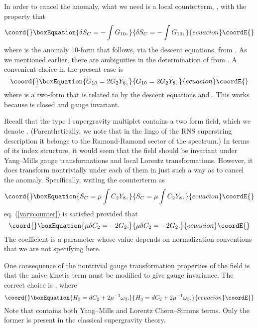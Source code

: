 \documentclass[a4paper,12pt]{article}
\begin{document}
In order to cancel the anomaly, what we need is a local
counterterm, \coordHE{}, with the property that
\begin{equation}\coord{}\boxEquation{ \label{varycounter}
\delta S_{C} = - \int G_{10},
}{ \delta S_{C} = - \int G_{10},
}{ecuacion}\coordE{}\end{equation}
where \coordHE{} is the anomaly  10-form that follows, via the
descent equations, from \coordHE{}. As we mentioned
earlier, there are ambiguities in the determination of \coordHE{}
from \coordHE{}. A convenient choice in the present case is 
\begin{equation}\coord{}\boxEquation{
G_{10} =  2 G_2 Y_8,
}{
G_{10} =  2 G_2 Y_8,
}{ecuacion}\coordE{}\end{equation} 
where \coordHE{} is a two-form that is related to \coordHE{} by
the descent equations \coordHE{} and \coordHE{}. 
This works because \coordHE{} is closed and
gauge invariant.

Recall that the type I supergravity multiplet contains a two form
field, which we denote \coordHE{}. (Parenthetically, we note that in
the lingo of the RNS superstring description it belongs to the
Ramond-Ramond sector of the spectrum.) In terms of its index
structure, it would seem that the field \coordHE{} should be invariant
under Yang--Mills gauge transformations and local Lorentz
transformations. However, it does transform nontrivially under
each of them in just such a way as to cancel the
anomaly.\cite{Green:1984sg} Specifically, writing the counterterm
as
\begin{equation}\coord{}\boxEquation{
 S_{C} = \mu \int C_2 Y_8,
}{
 S_{C} = \mu \int C_2 Y_8,
}{ecuacion}\coordE{}\end{equation}
eq. (\ref{varycounter}) is satisfied provided that
\begin{equation}\coord{}\boxEquation{
\mu \delta C_2 = -2 G_2.
}{
\mu \delta C_2 = -2 G_2.
}{ecuacion}\coordE{}\end{equation}
The coefficient \myHighlight{$\mu$}\coordHE{} is a parameter whose value depends on
normalization conventions that we are not specifying here.

One consequence of the nontrivial gauge transformation properties
of the field \coordHE{} is that the naive kinetic term \coordHE{}
must be modified to give gauge invariance. The correct choice is
\coordHE{}, where
\begin{equation}\coord{}\boxEquation{
H_3 = dC_2 + 2 \mu^{-1} \omega_3.
}{
H_3 = dC_2 + 2 \mu^{-1} \omega_3.
}{ecuacion}\coordE{}\end{equation}
Note that \coordHE{} contains both  Yang--Mills and Lorentz
Chern--Simons terms. Only the former is present in the classical
supergravity theory.
\end{document}
